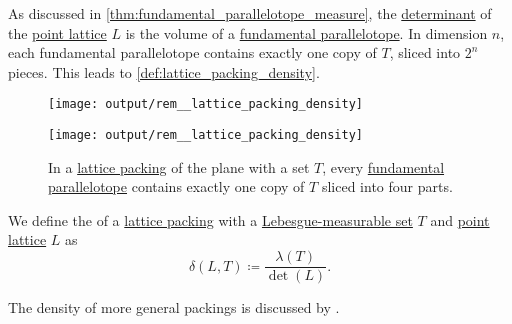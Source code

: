 \begin{remark}\label{rem:lattice_packing_density}
  As discussed in \cref{thm:fundamental_parallelotope_measure}, the \hyperref[def:point_lattice_determinant]{determinant} of the \hyperref[def:point_lattice]{point lattice} \( L \) is the volume of a \hyperref[def:fundamental_parallelotope]{fundamental parallelotope}. In dimension \( n \), each fundamental parallelotope contains exactly one copy of \( T \), sliced into \( 2^n \) pieces. This leads to \cref{def:lattice_packing_density}.

  \begin{figure}[!ht]
    \begin{subcaptionblock}{0.45\linewidth}
      \centering
      \texttt{[image: output/rem\_\_lattice\_packing\_density]}
    \end{subcaptionblock}
    \hfill
    \begin{subcaptionblock}{0.45\linewidth}
      \centering
      \texttt{[image: output/rem\_\_lattice\_packing\_density]}
    \end{subcaptionblock}
    \caption{In a \hyperref[def:lattice_packing]{lattice packing} of the plane with a set \( T \), every \hyperref[def:fundamental_parallelotope]{fundamental parallelotope} contains exactly one copy of \( T \) sliced into four parts.}\label{fig:rem:lattice_packing_density}
  \end{figure}
\end{remark}

\begin{definition}\label{def:lattice_packing_density}
  We define the  of a \hyperref[def:lattice_packing]{lattice packing} with a \hyperref[def:lebesgue_measure]{Lebesgue-measurable set} \( T \) and \hyperref[def:point_lattice]{point lattice} \( L \) as
  \begin{equation}\label{eq:def:lattice_packing_density}
    \delta(L, T) \coloneqq \frac {\lambda(T)} {\det(L)}.
  \end{equation}
\end{definition}
\begin{comments}
  \item The density of more general packings is discussed by .
\end{comments}

